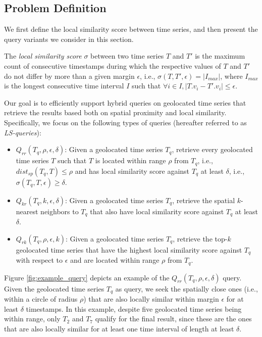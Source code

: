 
\subsection{Problem Definition}
\label{subsec:local_sim_search_problem}

\graphicspath{{Papers/SSTD2019/}{Papers/SIGSpatial2019/}}

We first define the local similarity score between time series, and then present the query variants we consider in this section.

\begin{mydefinition}
The {\em local similarity score} $\sigma$ between two time series $T$ and $T'$ is the maximum count of consecutive timestamps during which the respective values of $T$ and $T'$ do not differ by more than a given margin $\epsilon$, i.e., $\sigma(T, T', \epsilon) = |I_{max}|$, where $I_{max}$ is the longest consecutive time interval $I$ such that $\forall i \in I, |T.v_{i} - T'.v_{i}| \leq \epsilon$.
\end{mydefinition}

Our goal is to efficiently support hybrid queries on geolocated time series that retrieve the results based both on spatial proximity and local similarity. Specifically, we focus on the following types of queries (hereafter referred to as \textit{LS-queries}):

\begin{itemize}
    \item $Q_{rr}(T_q, \rho, \epsilon, \delta)$: Given a geolocated time series $T_q$, retrieve every geolocated time series $T$ such that $T$ is located within range $\rho$ from $T_q$, i.e., $dist_{sp}(T_q, T) \leq \rho$ and has local similarity score against $T_q$ at least $\delta$, i.e., $\sigma(T_q, T, \epsilon) \geq \delta$.
    \item $Q_{kr}(T_q, k, \epsilon, \delta)$: Given a geolocated time series $T_q$, retrieve the spatial $k$-nearest neighbors to $T_q$ that also have local similarity score against $T_q$ at least $\delta$.
    \item $Q_{rk}(T_q, \rho, \epsilon, k)$: Given a geolocated time series $T_q$, retrieve the top-$k$ geolocated time series that have the highest local similarity score against $T_q$ with respect to $\epsilon$ and are located within range $\rho$ from $T_q$.
\end{itemize}

\begin{myexample}
 Figure \ref{fig:example_query} depicts an example of the $Q_{rr}(T_q, \rho, \epsilon, \delta)$ query. Given the geolocated time series $T_q$ as query, we seek the spatially close ones (i.e., within a circle of radius $\rho$) that are also locally similar within margin $\epsilon$ for at least $\delta$ timestamps. In this example, despite five geolocated time series being within range, only $T_2$ and $T_7$ qualify for the final result, since these are the ones that are also locally similar for at least one time interval of length at least $\delta$.
\end{myexample}